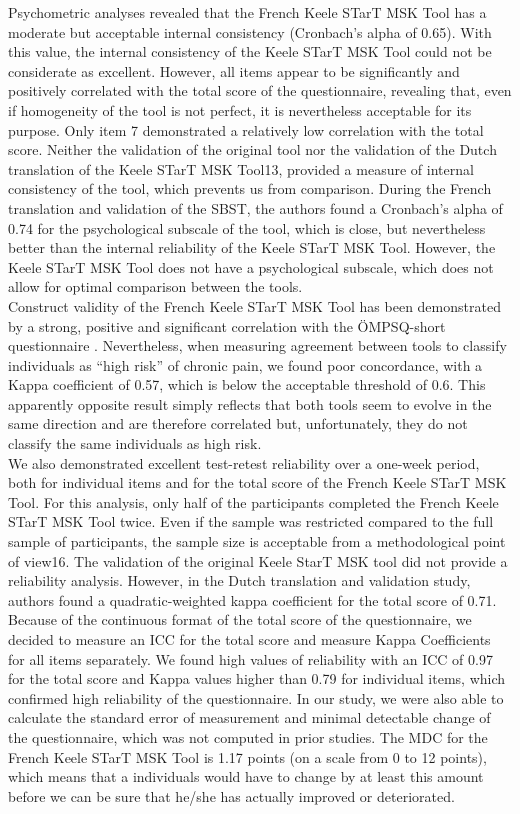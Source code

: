 Psychometric analyses revealed that the French Keele STarT MSK Tool has a moderate but acceptable internal consistency (Cronbach’s alpha of 0.65). With this value, the internal consistency of the Keele STarT MSK Tool could not be considerate as excellent. However, all items appear to be significantly and positively correlated with the total score of the questionnaire, revealing that, even if homogeneity of the tool is not perfect, it is nevertheless acceptable for its purpose. Only item 7 demonstrated a relatively low correlation with the total score. Neither the validation of the original tool \citep{dunn2021refinement} nor the validation of the Dutch translation of the Keele STarT MSK Tool13, provided a measure of internal consistency of the tool, which prevents us from comparison. During the French translation and validation of the SBST, the authors found a Cronbach’s alpha of 0.74 for the psychological subscale of the tool, which is close, but nevertheless better than the internal reliability of the Keele STarT MSK Tool. However, the Keele STarT MSK Tool does not have a psychological subscale, which does not allow for optimal comparison between the tools.\\ 
Construct validity of the French Keele STarT MSK Tool has been demonstrated by a strong, positive and significant correlation with the ÖMPSQ-short questionnaire \citep{simula2020association}. Nevertheless, when measuring agreement between tools to classify individuals as “high risk” of chronic pain, we found poor concordance, with a Kappa coefficient of 0.57, which is below the acceptable threshold of 0.6. This apparently opposite result simply reflects that both tools seem to evolve in the same direction and are therefore correlated but, unfortunately, they do not classify the same individuals as high risk.\\ 
We also demonstrated excellent test-retest reliability over a one-week period, both for individual items and for the total score of the French Keele STarT MSK Tool. For this analysis, only half of the participants completed the French Keele STarT MSK Tool twice. Even if the sample was restricted compared to the full sample of participants, the sample size is acceptable from a methodological point of view16. The validation of the original Keele StarT MSK tool did not provide a reliability analysis. However, in the Dutch translation and validation study, authors found a quadratic-weighted kappa coefficient for the total score of 0.71. Because of the continuous format of the total score of the questionnaire, we decided to measure an ICC for the total score and measure Kappa Coefficients for all items separately. We found high values of reliability with an ICC of 0.97 for the total score and Kappa values higher than 0.79 for individual items, which confirmed high reliability of the questionnaire. In our study, we were also able to calculate the standard error of measurement and minimal detectable change of the questionnaire, which was not computed in prior studies. The MDC for the French Keele STarT MSK Tool is 1.17 points (on a scale from 0 to 12 points), which means that a individuals would have to change by at least this amount before we can be sure that he/she has actually improved or deteriorated.\\
